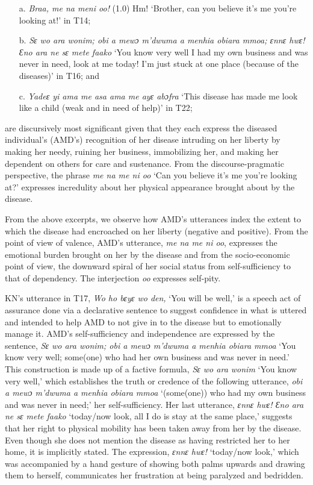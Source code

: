 \documentclass[output=paper,colorlinks,citecolor=brown]{langscibook}
\begin{document}
\begin{enumerate}
    \item[a.] \textit{Braa, me na meni oo!} (1.0) Hm! ‘Brother, can you believe it’s me you’re looking at!’ in T14; 
    \item[b.] \textit{Sɛ wo ara wonim; obi a mewɔ m’dwuma a menhia obiara mmoa; ɛnnɛ hwɛ! Ɛno ara ne sɛ mete faako} ‘You know very well I had my own business and was never in need, look at me today! I’m just stuck at one place (because of the diseases)’ in T16; and
    \item[c.] \textit{Yadeɛ yi ama me asa ama me ayɛ abɔfra} ‘This disease has made me look like a child (weak and in need of help)’ in T22; 
\end{enumerate}
are discursively most significant given that they each express the diseased individual’s (AMD’s) recognition of her disease intruding on her liberty by making her needy, ruining her business, immobilizing her, and making her dependent on others for care and sustenance. From the discourse-pragmatic perspective, the phrase \textit{me na me ni oo} ‘Can you believe it’s me you’re looking at?’ expresses incredulity about her physical appearance brought about by the disease. 

From the above excerpts, we observe how AMD’s utterances index the extent to which the disease had encroached on her liberty (negative and positive). From the point of view of valence, AMD’s utterance, \textit{me na me ni oo}, expresses the emotional burden brought on her by the disease and from the socio-economic point of view, the downward spiral of her social status from self-sufficiency to that of dependency. The interjection \textit{oo} expresses self-pity.

KN’s utterance in T17, \textit{Wo ho bɛyɛ wo den,} ‘You will be well,' is a speech act of assurance done via a declarative sentence to suggest confidence in what is uttered and intended to help AMD to not give in to the disease but to emotionally manage it. AMD’s self-sufficiency and independence are expressed by the sentence, \textit{Sɛ wo ara wonim; obi a mewɔ m’dwuma a menhia obiara mmoa} ‘You know very well; some(one) who had her own business and was never in need.’ This construction is made up of a factive formula, \textit{Sɛ wo ara wonim} ‘You know very well,’ which establishes the truth or credence of the following utterance, \textit{obi a mewɔ m’dwuma a menhia obiara mmoa} ‘(some(one)) who had my own business and was never in need;’ her self-sufficiency. Her last utterance, \textit{ɛnnɛ hwɛ! Ɛno ara ne sɛ mete faako} ‘today/now look, all I do is stay at the same place,’ suggests that her right to physical mobility has been taken away from her by the disease. Even though she does not mention the disease as having restricted her to her home, it is implicitly stated. The expression, \textit{ɛnnɛ hwɛ!} ‘today/now look,’ which was accompanied by a hand gesture of showing both palms upwards and drawing them to herself, communicates her frustration at being paralyzed and bedridden. 
\end{document}
